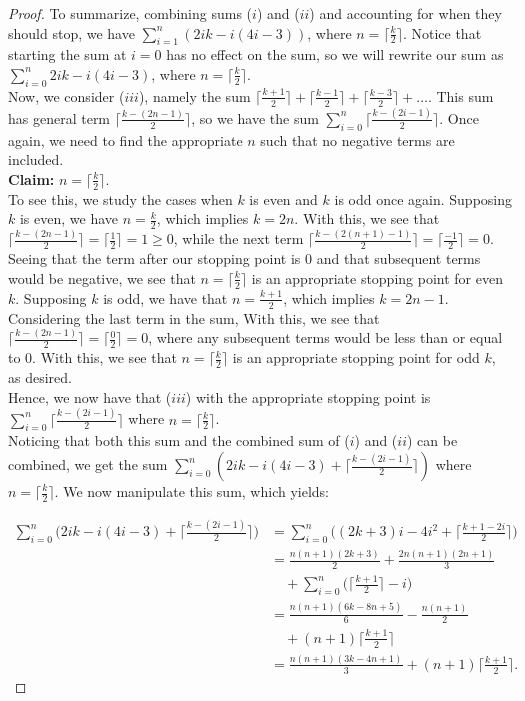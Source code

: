 \documentclass[10pt,a4paper]{amsart}
\begin{document}
\begin{proof}
    To summarize, combining sums ($i$) and ($ii$) and accounting for when they should stop, we have $\sum_{i=1}^n (2ik-i(4i-3))$, where $n = \lceil\frac{k}{2}\rceil$. Notice that starting the sum at $i=0$ has no effect on the sum, so we will rewrite our sum as $\sum_{i=0}^n 2ik-i(4i-3)$, where $n = \lceil\frac{k}{2}\rceil$. \\
    Now, we consider ($iii$), namely the sum $\lceil\frac{k+1}{2}\rceil + \lceil\frac{k-1}{2}\rceil + \lceil\frac{k-3}{2}\rceil + \dots $. This sum has general term $\lceil\frac{k-(2n-1)}{2}\rceil$, so we have the sum $\sum_{i=0}^n\lceil\frac{k-(2i-1)}{2}\rceil$. Once again, we need to find the appropriate $n$ such that no negative terms are included. \\

    \textbf{Claim:} $n = \lceil\frac{k}{2}\rceil$. \\

    To see this, we study the cases when $k$ is even and $k$ is odd once again. Supposing $k$ is even, we have $n = \frac{k}{2}$, which implies $k = 2n$. With this, we see that $\lceil\frac{k-(2n-1)}{2}\rceil = \lceil\frac{1}{2}\rceil = 1\geq 0$, while the next term $\lceil\frac{k-(2(n+1)-1)}{2}\rceil = \lceil\frac{-1}{2}\rceil = 0$. Seeing that the term after our stopping point is 0 and that subsequent terms would be negative, we see that $n = \lceil\frac{k}{2}\rceil$ is an appropriate stopping point for even $k$. Supposing $k$ is odd, we have that $n = \frac{k+1}{2}$, which implies $k = 2n-1$. Considering the last term in the sum, With this, we see that $\lceil\frac{k-(2n-1)}{2}\rceil = \lceil\frac{0}{2}\rceil = 0$, where any subsequent terms would be less than or equal to 0. With this, we see that $n = \lceil\frac{k}{2}\rceil$ is an appropriate stopping point for odd $k$, as desired. \\

    Hence, we now have that ($iii$) with the appropriate stopping point is $\sum_{i=0}^n\lceil\frac{k-(2i-1)}{2}\rceil$ where $n = \lceil\frac{k}{2}\rceil$. \\
    Noticing that both this sum and the combined sum of ($i$) and ($ii$) can be combined, we get the sum $\sum_{i=0}^n (2ik - i(4i-3) + \lceil\frac{k-(2i-1)}{2}\rceil)$ where $n = \lceil\frac{k}{2}\rceil$. We now manipulate this sum, which yields:

    \begin{align*}
        \sum_{i=0}^n \bigg(2ik - i(4i-3) + \bigg\lceil\frac{k-(2i-1)}{2}\bigg\rceil\bigg) &= \sum_{i=0}^n \bigg((2k+3)i - 4i^2 + \bigg\lceil\frac{k+1-2i}{2}\bigg\rceil\bigg)\\
        &= \frac{n(n+1)(2k+3)}{2} + \frac{2n(n+1)(2n+1)}{3}\\
        &\quad + \sum_{i=0}^n\bigg(\bigg\lceil\frac{k+1}{2}\bigg\rceil - i\bigg)\\
        &= \frac{n(n+1)(6k-8n+5)}{6} - \frac{n(n+1)}{2}\\
        &\quad + (n+1)\bigg\lceil\frac{k+1}{2}\bigg\rceil\\
        &= \frac{n(n+1)(3k-4n+1)}{3}+(n+1)\bigg\lceil\frac{k+1}{2}\bigg\rceil.
    \end{align*} 
\end{proof}
\end{document}
